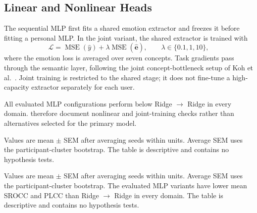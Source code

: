 \documentclass[10pt,twocolumn,letterpaper]{article}
\begin{document}
\subsection{Linear and Nonlinear Heads}
\label{sec:supp_joint}
The sequential MLP first fits a shared emotion extractor and freezes it before
fitting a personal MLP. In the joint variant, the shared extractor is trained
with
\begin{equation}
\mathcal{L}=\operatorname{MSE}(\hat y)+
\lambda\operatorname{MSE}(\hat{\mathbf e}),
\qquad \lambda\in\{0.1,1,10\},
\end{equation}
where the emotion loss is averaged over seven concepts. Task gradients pass
through the semantic layer, following the joint concept-bottleneck setup of
Koh et al.~\cite{pmlr-v119-koh20a}. Joint training is restricted to the shared
stage; it does not fine-tune a high-capacity extractor separately for each user.

All evaluated MLP configurations perform below Ridge $\to$ Ridge in every
domain.  therefore document nonlinear and
joint-training checks rather than alternatives selected for the primary model.

\begin{table}[!tbp]
\centering
\begin{threeparttable}
\caption{Ridge and sequential MLP heads for each mediator. Qwen3-VL 8B,
population-anchored, $N=100$.}
\label{tab:mlp_baseline}
\footnotesize
\setlength{\tabcolsep}{3pt}
    
\begin{tablenotes}[flushleft]\footnotesize
    \item Values are mean $\pm$ SEM after averaging seeds within units. Average
    SEM uses the participant-cluster bootstrap. The table is descriptive and
    contains no hypothesis tests.
\end{tablenotes}
\end{threeparttable}
\end{table}

\begin{table}[!tbp]
\centering
\begin{threeparttable}
\caption{Sequential and joint MLP training for the Hybrid mediator. Qwen3-VL
8B, population-anchored, $N=100$.}
\label{tab:mlp}
\footnotesize
    
\begin{tablenotes}[flushleft]\footnotesize
    \item Values are mean $\pm$ SEM after averaging seeds within units. Average SEM uses the participant-cluster bootstrap. The evaluated MLP variants have lower mean SROCC and PLCC than Ridge $\to$ Ridge in every domain. The table is descriptive and contains no hypothesis tests.
\end{tablenotes}
\end{threeparttable}
\end{table}
\end{document}
